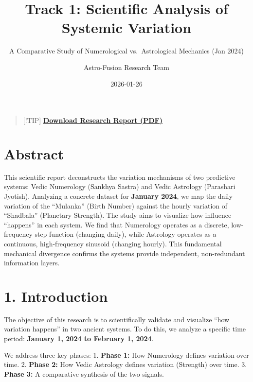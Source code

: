 \documentclass[
  11pt,
  oneside,
  openany]{scrbook}
\title{Track 1: Scientific Analysis of Systemic Variation}
\subtitle{A Comparative Study of Numerological vs.~Astrological
Mechanics (Jan 2024)}
\author{Astro-Fusion Research Team}
\date{2026-01-26}
\begin{document}
\frontmatter
\maketitle



\mainmatter
\begin{quote}
{[}!TIP{]}
\textbf{\href{../../../reports/research_numerology_correlation.pdf}{Download
Research Report (PDF)}}
\end{quote}

\chapter{Abstract}\label{abstract}

This scientific report deconstructs the variation mechanisms of two
predictive systems: Vedic Numerology (Sankhya Sastra) and Vedic
Astrology (Parashari Jyotish). Analyzing a concrete dataset for
\textbf{January 2024}, we map the daily variation of the ``Mulanka''
(Birth Number) against the hourly variation of ``Shadbala'' (Planetary
Strength). The study aims to visualize how influence ``happens'' in each
system. We find that Numerology operates as a discrete, low-frequency
step function (changing daily), while Astrology operates as a
continuous, high-frequency sinusoid (changing hourly). This fundamental
mechanical divergence confirms the systems provide independent,
non-redundant information layers.

\chapter{1. Introduction}\label{introduction}

The objective of this research is to scientifically validate and
visualize ``how variation happens'' in two ancient systems. To do this,
we analyze a specific time period: \textbf{January 1, 2024 to February
1, 2024}.

We address three key phases: 1. \textbf{Phase 1:} How Numerology defines
variation over time. 2. \textbf{Phase 2:} How Vedic Astrology defines
variation (Strength) over time. 3. \textbf{Phase 3:} A comparative
synthesis of the two signals.
\end{document}
